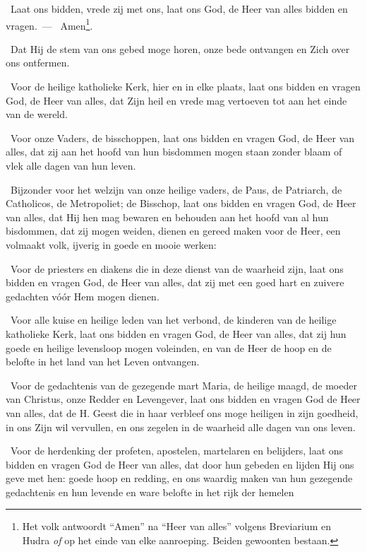 \documentclass[12pt,twoside,a5paper]{article}
\begin{document}
\begin{halfparskip}
  \liturgicalLbracket\dd~Laat ons bidden, vrede zij met ons, laat ons God, de Heer van alles bidden en vragen.~--- \rr~Amen\footnote{Het volk antwoordt ``Amen'' na ``Heer van alles'' volgens Breviarium en Hudra \emph{of} op het einde van elke aanroeping. Beiden gewoonten bestaan.}.

  \dd~Dat Hij de stem van ons gebed moge horen, onze bede ontvangen en Zich over ons ontfermen.

  \dd~Voor de heilige katholieke Kerk, hier en in elke plaats, laat ons bidden en vragen God, de Heer van alles, dat Zijn heil en vrede mag vertoeven tot aan het einde van de wereld.

  \dd~Voor onze Vaders, de bisschoppen, laat ons bidden en vragen God, de Heer van alles, dat zij aan het hoofd van hun bisdommen mogen staan zonder blaam of vlek alle dagen van hun leven.

  \dd~Bijzonder voor het welzijn van onze heilige vaders, de Paus, de Patriarch, de Catholicos, de Metropoliet; de Bisschop, laat ons bidden en vragen God, de Heer van alles, dat Hij hen mag bewaren en behouden aan het hoofd van al hun bisdommen, dat zij mogen weiden, dienen en gereed maken voor de Heer, een volmaakt volk, ijverig in goede en mooie werken:

  \dd~Voor de priesters en diakens die in deze dienst van de waarheid zijn, laat ons bidden en vragen God, de Heer van alles, dat zij met een goed hart en zuivere gedachten vóór Hem mogen dienen.

  \dd~Voor alle kuise en heilige leden van het verbond, de kinderen van de heilige katholieke Kerk, laat ons bidden en vragen God, de Heer van alles, dat zij hun goede en heilige levensloop mogen voleinden, en van de Heer de hoop en de belofte in het land van het Leven ontvangen.

  \dd~Voor de gedachtenis van de gezegende mart Maria, de heilige maagd, de moeder van Christus, onze Redder en Levengever, laat ons bidden en vragen God de Heer van alles, dat de H. Geest die in haar verbleef ons moge heiligen in zijn goedheid, in ons Zijn wil vervullen, en ons zegelen in de waarheid alle dagen van ons leven.

  \dd~Voor de herdenking der profeten, apostelen, martelaren en belijders, laat ons bidden en vragen God de Heer van alles, dat door hun gebeden en lijden Hij ons geve met hen: goede hoop en redding, en ons waardig maken van hun gezegende gedachtenis en hun levende en ware belofte in het rijk der hemelen


\end{halfparskip}
\end{document}

